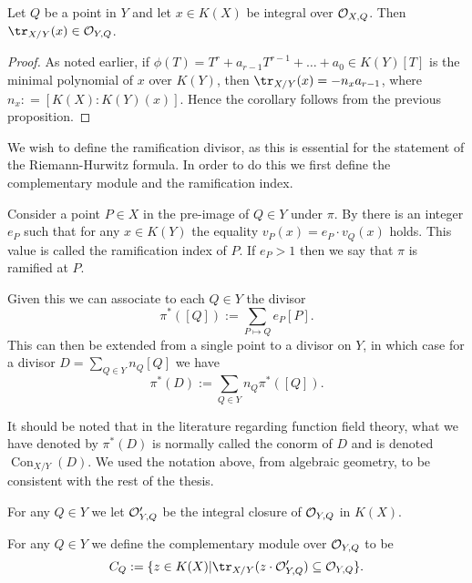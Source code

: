     \begin{cor}\label{traceinclosure}
    Let $Q$ be a point in $Y$ and let $x\in K(X)$ be integral over ${\cal O}_{X,Q}$.
    Then $\tr_{X/Y}(x)\in \cO_{Y,Q}$.
    \end{cor}
    \begin{proof}
    As noted earlier, if $\phi(T)=T^r+a_{r-1}T^{r-1} + \ldots + a_0\in K(Y)[T]$ is the minimal polynomial of $x$ over $K(Y)$, then $\tr_{X/Y}(x)=-n_xa_{r-1}$, where $n_x : = [K(X):K(Y)(x)]$.
    Hence the corollary follows from the previous proposition.
    \end{proof}


We wish to define the ramification divisor, as this is essential for the statement of the Riemann-Hurwitz formula.
In order to do this we first define the complementary module and the ramification index.


    \begin{defn}\label{definitionramificationdivisor}
    Consider a point $P\in X$ in the pre-image of $Q\in Y$ under $\pi$.
    By \cite[Prop. 3.1.4]{stichtenoth} there is an integer $e_P$ such that for any $x\in K(Y)$ the equality $v_P(x) = e_P\cdot v_Q(x)$ holds.
    This value is called the ramification index of $P$.
    If $e_P>1$ then we say that $\pi$ is ramified at $P$.
    \end{defn}

Given this we can associate to each $Q\in Y$ the divisor
    \[
    \pi^*([Q]) := \sum_{P\mapsto Q} e_P [P].
    \]
This can then be extended from a single point to a divisor on $Y$, in which case for a divisor $D = \sum_{Q\in Y}n_Q [Q]$ we have
    \[
    \pi^*(D) := \sum_{Q\in Y}n_Q \pi^*([Q]).
    \]

    \begin{rem}
    It should be noted that in the literature regarding function field theory, what we have denoted by $\pi^*(D)$ is normally called the conorm of $D$ and is denoted $\operatorname{Con}_{X/Y}(D)$. 
    We used the notation above, from algebraic geometry, to be consistent with the rest of the thesis.
    \end{rem}

    For any $Q\in Y$ we let ${\cal O}_{Y,Q}'$ be the integral closure of ${\cal O}_{Y,Q}$ in $K(X)$.

    \begin{defn}
    For any $Q \in Y$ we define the complementary module over ${\cal O}_{Y,Q}$ to be
        \[
        C_Q :=\{z\in K(X) | \tr_{X/Y}(z\cdot \cO_{Y,Q}') \subseteq \cO_{Y,Q}\}.
        \]
    \end{defn}


